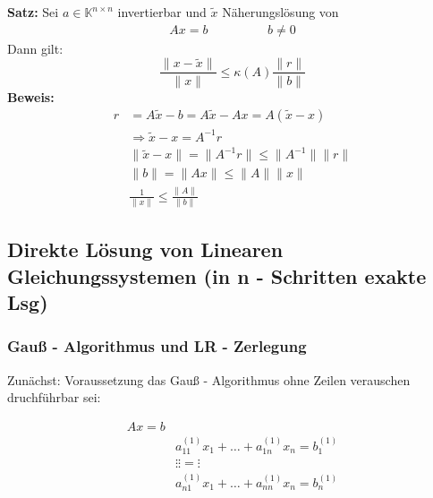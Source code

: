 \textbf{Satz:}
Sei $a \in \mathbb{K}^{n \times n}$ invertierbar und $\widetilde{x}$ Näherungslösung von
\begin{equation*}
\begin{aligned}
Ax = b \hspace{2cm} b \neq 0
\end{aligned}
\end{equation*}
Dann gilt:
\begin{equation*}
\frac{\|x - \widetilde{x}\|}{\|x\|} \leq \kappa\left(A\right) \frac{\|r\|}{\|b\|}
\end{equation*}
\textbf{Beweis:}
\begin{equation*}
\begin{aligned}
r &= A\widetilde{x} - b = A\widetilde{x} - Ax = A\left(\widetilde{x} - x\right) \\
&\Rightarrow \widetilde{x} - x = A^{-1}r \\
&\|\widetilde{x} - x\| = \|A^{-1}r\| \leq \|A^{-1}\|\|r\| \\
&\|b\| = \|Ax\| \leq \|A\|\|x\| \\
&\frac{1}{\|x\|} \leq \frac{\|A\|}{\|b\|}
\end{aligned}
\end{equation*}

\subsection{Direkte Lösung von Linearen Gleichungssystemen (in n - Schritten exakte Lsg)}
\subsubsection{Gauß - Algorithmus und LR - Zerlegung}
Zunächst: Voraussetzung das Gauß - Algorithmus ohne Zeilen verauschen druchführbar sei:

\begin{equation*}
  \begin{aligned}
    Ax = b \\
    &a_{11}^{\left(1\right)}x_1 + \ldots + a_{1n}^{\left(1\right)}x_n = b_1^{\left(1\right)}  \\
    &\vdots                               \vdots                     = \vdots  \\
    &a_{n1}^{(1)}x_1 + \ldots + a_{nn}^{(1)}x_n = b_n^{(1)}  \\
  \end{aligned}
\end{equation*}

